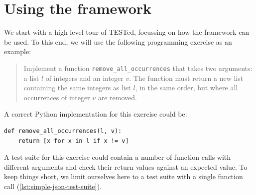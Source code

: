 \documentclass[../main]{subfiles}
\begin{document}
\section{Using the framework}\label{sec:tested1-using-the-framework}

We start with a high-level tour of TESTed, focussing on how the framework can be used.
To this end, we will use the following programming exercise as an example:

\begin{quote}
    Implement a function \texttt{remove\_all\_occurrences} that takes two arguments: a list $l$ of integers and an integer $v$.
    The function must return a new list containing the same integers as list $l$, in the same order, but where all occurrences of integer $v$ are removed.
\end{quote}

A correct Python implementation for this exercise could be:

\begin{verbatim}
def remove_all_occurrences(l, v):
    return [x for x in l if x != v]
\end{verbatim}

A test suite for this exercise could contain a number of function calls with different arguments and check their return values against an expected value.
To keep things short, we limit ourselves here to a test suite with a single function call (\cref{lst:simple-json-test-suite}).

\end{document}
